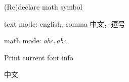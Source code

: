 \documentclass{ctexart}
\begin{document}
\setcounter{tcb@cnt@example}{2}
\begin{example}{(Re)declare math symbol}

  \LARGE
  text mode: english, comma 中文，逗号\par
  math mode: $abc, abc$
\end{example}

\begin{example*}{Print current font info}
  \newcommand{\printInternalCurrentFont}{%
    \texttt{\expandafter\string\the\font}%
  }

  中文\printInternalCurrentFont
\end{example*}
\end{document}
